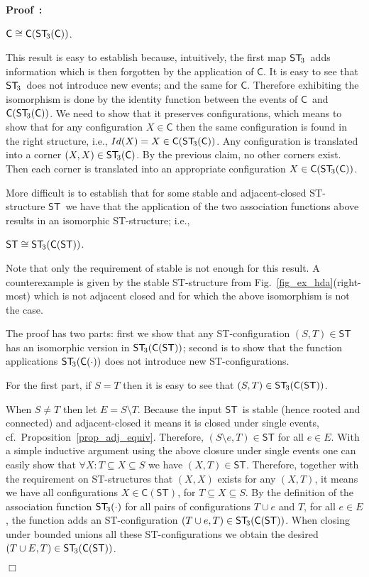 \documentclass[submission,copyright,creativecommons]{eptcs}
\newenvironment{proof}[1][\!\!\,]{\vspace{1ex}\noindent\textbf{Proof #1: }}{\hfill$\Box$\vspace{2ex}}
\newcounter{case}
\newcommand\C{\ensuremath{\mathsf{C}}}
\newcommand\ST{\ensuremath{\mathsf{ST}}}
\newcommand\isomorphic{\ensuremath{\cong}}
\newcommand\cintostThird{\ensuremath{\mathsf{ST}_{\hspace{-0.4ex}3}}}
\newcommand\stintoc{\ensuremath{\mathsf{C}}}
\begin{document}
\begin{proof}
\centerline{$\C\isomorphic \stintoc(\cintostThird(\C))$.}

This result is easy to establish because, intuitively, the first map \cintostThird\ adds information which is then forgotten by the application of \C. It is easy to see that \cintostThird\ does not introduce new events; and the same for \stintoc. Therefore exhibiting the isomorphism is done by the identity function between the events of \stintoc\ and $\stintoc(\cintostThird(\C))$. We need to show that it preserves configurations, which means to show that for any configuration $X\in\C$ then the same configuration is found in the right structure, i.e., $Id(X)=X\in\stintoc(\cintostThird(\C))$. Any configuration is translated into a corner $(X,X)\in\cintostThird(\C)$. By the previous claim, no other corners exist. Then each corner is translated into an appropriate configuration $X\in\stintoc(\cintostThird(\C))$.

\vspace{1ex}
More difficult is to establish that for some stable and adjacent-closed ST-structure \ST\ we have that the application of the two association functions above results in an isomorphic ST-structure; i.e., 

\vspace{-1ex}\centerline{$\ST\isomorphic \cintostThird(\C(\ST))$.}

Note that only the requirement of stable is not enough for this result. A counterexample is given by the stable ST-structure from Fig.~\ref{fig_ex_hda}(right-most) which is not adjacent closed and for which the above isomorphism is not the case.

The proof has two parts: first we show that any ST-configuration $(S,T)\in\ST$ has an isomorphic version in $\cintostThird(\C(\ST))$; second is to show that the function applications $\cintostThird(\C(\cdot))$ does not introduce new ST-configurations.

For the first part, if $S=T$ then it is easy to see that $(S,T)\in\cintostThird(\C(\ST))$.

When $S\neq T$ then let $E=S\setminus T$. Because the input \ST\ is stable (hence rooted and connected) and adjacent-closed it means it is closed under single events, cf.~Proposition~\ref{prop_adj_equiv}. Therefore, $(S\setminus e,T)\in\ST$ for all $e\in E$. With a simple inductive argument using the above closure under single events one can easily show that $\forall X:T\subseteq X\subseteq S$ we have $(X,T)\in\ST$. Therefore, together with the requirement on ST-structures that $(X,X)$ exists for any $(X,T)$, it means we have all configurations $X\in\C(\ST)$, for $T\subseteq X\subseteq S$. By the definition of the association function $\cintostThird(\cdot)$ for all pairs of configurations $T\cup e$ and $T$, for all $e\in E$, the function adds an ST-configuration $(T\cup e,T)\in\cintostThird(\C(\ST))$. When closing under bounded unions all these ST-configurations we obtain the desired $(T\cup E,T)\in\cintostThird(\C(\ST))$.


\end{proof}
\end{document}
